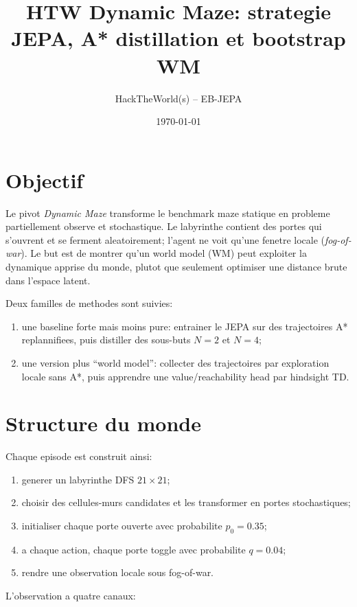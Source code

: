 \documentclass[11pt,a4paper]{article}
\title{HTW Dynamic Maze: strategie JEPA, A* distillation et bootstrap WM}
\author{HackTheWorld(s) -- EB-JEPA}
\date{\today}
\begin{document}
\maketitle

\section{Objectif}

Le pivot \emph{Dynamic Maze} transforme le benchmark maze statique en probleme
partiellement observe et stochastique. Le labyrinthe contient des portes qui
s'ouvrent et se ferment aleatoirement; l'agent ne voit qu'une fenetre locale
(\emph{fog-of-war}). Le but est de montrer qu'un world model (WM) peut exploiter
la dynamique apprise du monde, plutot que seulement optimiser une distance brute
dans l'espace latent.

Deux familles de methodes sont suivies:

\begin{enumerate}
  \item une baseline forte mais moins pure: entrainer le JEPA sur des trajectoires
        A* replannifiees, puis distiller des sous-buts \(N=2\) et \(N=4\);
  \item une version plus ``world model'': collecter des trajectoires par
        exploration locale sans A*, puis apprendre une value/reachability head par
        hindsight TD.
\end{enumerate}

\section{Structure du monde}

Chaque episode est construit ainsi:

\begin{enumerate}
  \item generer un labyrinthe DFS \(21\times 21\);
  \item choisir des cellules-murs candidates et les transformer en portes
        stochastiques;
  \item initialiser chaque porte ouverte avec probabilite \(p_0=0.35\);
  \item a chaque action, chaque porte toggle avec probabilite \(q=0.04\);
  \item rendre une observation locale sous fog-of-war.
\end{enumerate}

L'observation a quatre canaux:
\end{document}

